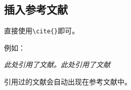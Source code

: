 \documentclass[12pt,hyperref,a4paper,UTF8]{ctexart}
\begin{document}
\subsection{插入参考文献}
直接使用\verb|\cite{}|即可\cite{DBLP:conf/nips/VaswaniSPUJGKP17}。

例如：


   \textit{ 此处引用了文献\cite{0Isaac}。此处引用了文献\cite{2016The}}


引用过的文献会自动出现在参考文献中。



\end{document}
